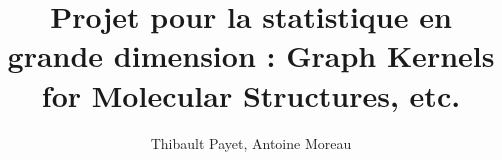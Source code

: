 \documentclass[usepdftitle=false]{beamer}
\title{Projet pour la statistique en grande dimension : Graph Kernels for Molecular Structures, etc.}
\author{Thibault Payet, Antoine Moreau}
\date{}
\begin{document}
    \begin{frame}
    \titlepage
    \end{frame}


    
    
    

    
\end{document}
